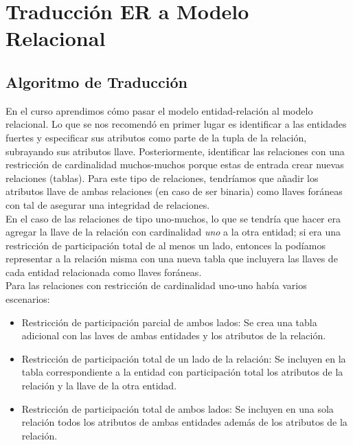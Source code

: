 \documentclass[11pt,letterpaper]{article}
\begin{document}
\begin{center}
\tableofcontents
\end{center}

\newpage

\section{Traducción ER a Modelo Relacional}

\subsection{Algoritmo de Traducción}

En el curso aprendimos cómo pasar el modelo entidad-relación al modelo relacional. Lo que se nos recomendó en primer lugar es identificar a las entidades fuertes y especificar sus atributos como parte de la tupla de la relación, subrayando sus atributos llave. Posteriormente, identificar las relaciones con una restricción de cardinalidad muchos-muchos porque estas de entrada crear nuevas relaciones (tablas). Para este tipo de relaciones, tendríamos que añadir los atributos llave de ambas relaciones (en caso de ser binaria) como llaves foráneas con tal de asegurar una integridad de relaciones. \\

En el caso de las relaciones de tipo uno-muchos, lo que se tendría que hacer era agregar la llave de la relación con cardinalidad \textit{uno} a la otra entidad; si era una restricción de participación total de al menos un lado, entonces la podíamos representar a la relación misma con una nueva tabla que incluyera las llaves de cada entidad relacionada como llaves foráneas.\\

Para las relaciones con restricción de cardinalidad uno-uno había varios escenarios:

\begin{itemize}
\item Restricción de participación parcial de ambos lados: Se crea una tabla adicional con las laves de ambas entidades y los atributos de la relación.
\item Restricción de participación total de un lado de la relación: Se incluyen en la tabla correspondiente a la entidad con participación total los atributos de la relación y la llave de la otra entidad.
\item Restricción de participación total de ambos lados: Se incluyen en una sola relación todos los atributos de ambas entidades además de los atributos de la relación.
\end{itemize}
\end{document}
